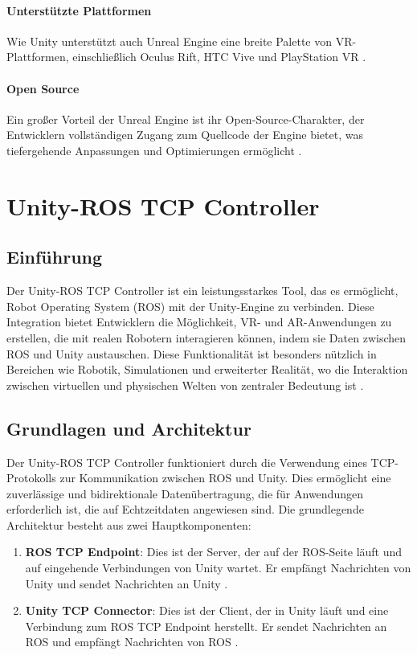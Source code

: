 \paragraph{Unterstützte Plattformen} Wie Unity unterstützt auch Unreal Engine eine breite Palette von VR-Plattformen, einschließlich Oculus Rift, HTC Vive und PlayStation VR \cite{epic2021}.
\paragraph{Open Source}
Ein großer Vorteil der Unreal Engine ist ihr Open-Source-Charakter, der Entwicklern vollständigen Zugang zum Quellcode der Engine bietet, was tiefergehende Anpassungen und Optimierungen ermöglicht \cite{epic2021}.
\section{Unity-ROS TCP Controller}

\subsection{Einführung}

Der Unity-ROS TCP Controller ist ein leistungsstarkes Tool, das es ermöglicht, Robot Operating System (ROS) mit der Unity-Engine zu verbinden. Diese Integration bietet Entwicklern die Möglichkeit, VR- und AR-Anwendungen zu erstellen, die mit realen Robotern interagieren können, indem sie Daten zwischen ROS und Unity austauschen. Diese Funktionalität ist besonders nützlich in Bereichen wie Robotik, Simulationen und erweiterter Realität, wo die Interaktion zwischen virtuellen und physischen Welten von zentraler Bedeutung ist \cite{ros_tcp_endpoint,unity_ros_tcp_connector}.

\subsection{Grundlagen und Architektur}

Der Unity-ROS TCP Controller funktioniert durch die Verwendung eines TCP-Protokolls zur Kommunikation zwischen ROS und Unity. Dies ermöglicht eine zuverlässige und bidirektionale Datenübertragung, die für Anwendungen erforderlich ist, die auf Echtzeitdaten angewiesen sind. Die grundlegende Architektur besteht aus zwei Hauptkomponenten:

\begin{enumerate}
    \item \textbf{ROS TCP Endpoint}: Dies ist der Server, der auf der ROS-Seite läuft und auf eingehende Verbindungen von Unity wartet. Er empfängt Nachrichten von Unity und sendet Nachrichten an Unity \cite{ros_tcp_endpoint}.
    \item \textbf{Unity TCP Connector}: Dies ist der Client, der in Unity läuft und eine Verbindung zum ROS TCP Endpoint herstellt. Er sendet Nachrichten an ROS und empfängt Nachrichten von ROS \cite{unity_ros_tcp_connector}.
\end{enumerate}

